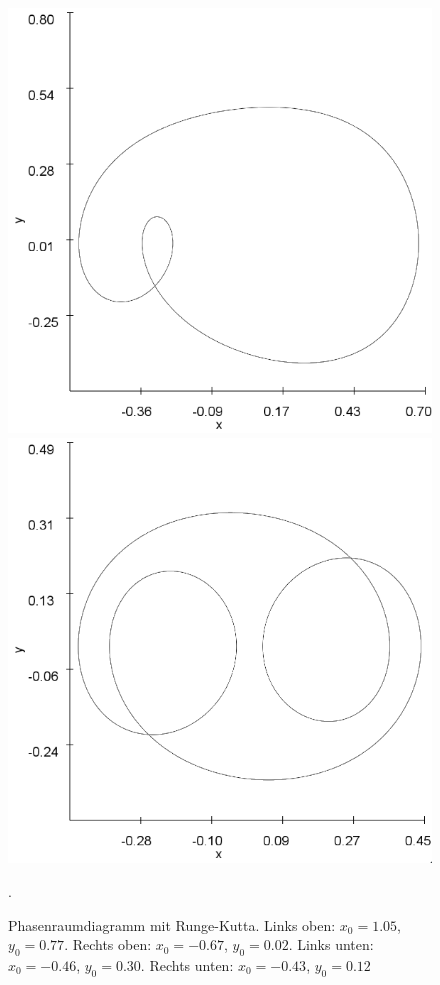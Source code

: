 \documentclass{scrartcl}
\begin{document}
\begin{figure}[!htbp]
\includegraphics[scale=0.4]{duffing-awp4-500k-nach-500k-h0,01-runge}
\includegraphics[scale=0.4]{duffing-awp5-500k-nach-500k-h0,01-runge}
\caption{Phasenraumdiagramm mit Runge-Kutta. Links oben: $x_0=1.05$, $y_0=0.77$. Rechts oben: $x_0=-0.67$, $y_0=0.02$. Links unten: $x_0=-0.46$, $y_0=0.30$. Rechts unten: $x_0=-0.43$, $y_0=0.12$}. 
\label{fig:duffing-allawp}
\end{figure}
\end{document}
